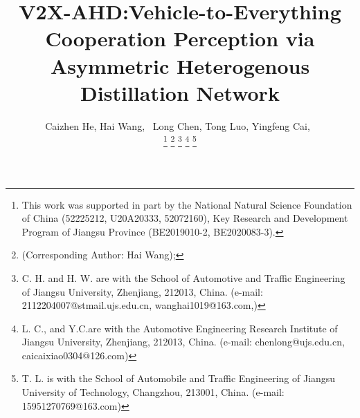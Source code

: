 \documentclass[lettersize,journal]{IEEEtran}
\begin{document}
\title{V2X-AHD:Vehicle-to-Everything Cooperation Perception via Asymmetric Heterogenous Distillation Network}

\author{Caizhen He, 
Hai Wang,~
Long Chen,
Tong Luo,
Yingfeng Cai,~

\thanks{This work was supported in part by the National Natural Science Foundation of China (52225212, U20A20333, 52072160), Key Research and Development Program of Jiangsu Province (BE2019010-2, BE2020083-3).}
\thanks{(Corresponding Author: Hai Wang);}
\thanks{C. H. and H. W. are with the School of Automotive and Traffic Engineering of Jiangsu University, Zhenjiang, 212013, China. (e-mail: 2112204007@stmail.ujs.edu.cn, wanghai1019@163.com,) }
\thanks{L. C., and Y.C.are with the Automotive Engineering Research Institute of Jiangsu University, Zhenjiang, 212013, China. (e-mail: chenlong@ujs.edu.cn, caicaixiao0304@126.com)}
\thanks{T. L. is with the School of Automobile and Traffic Engineering of Jiangsu University of Technology, Changzhou, 213001, China. (e-mail: 15951270769@163.com)}
}





\maketitle
\end{document}
